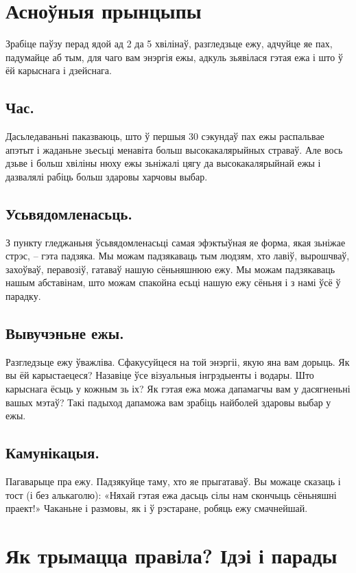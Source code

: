 \section{Асноўныя прынцыпы}

Зрабіце паўзу перад ядой ад 2 да 5 хвілінаў, разгледзьце ежу, адчуйце яе пах, падумайце аб тым, для чаго вам энэргія ежы, адкуль зьявілася гэтая ежа і што ў ёй карыснага і дзейснага.

\subsection{Час.}
Дасьледаваньні паказваюць, што ў першыя 30 сэкундаў пах ежы распальвае апэтыт і жаданьне зьесьці менавіта больш высокакалярыйных страваў. Але вось дзьве і больш хвіліны нюху ежы зьніжалі цягу да высокакалярыйнай ежы і дазвалялі рабіць больш здаровы харчовы выбар.

\subsection{Усьвядомленасьць.}
З пункту гледжаньня ўсьвядомленасьці самая эфэктыўная яе форма, якая зьніжае стрэс, – гэта падзяка. Мы можам падзякаваць тым людзям, хто лавіў, вырошчваў, захоўваў, перавозіў, гатаваў нашую сёньняшнюю ежу. Мы можам падзякаваць нашым абставінам, што можам спакойна есьці нашую ежу сёньня і з намі ўсё ў парадку.

\subsection{Вывучэньне ежы.}
Разгледзьце ежу ўважліва. Сфакусуйцеся на той энэргіі, якую яна вам дорыць. Як вы ёй карыстаецеся? Назавіце ўсе візуальныя інгрэдыенты і водары. Што карыснага ёсьць у кожным зь іх? Як гэтая ежа можа дапамагчы вам у дасягненьні вашых мэтаў? Такі падыход дапаможа вам зрабіць найболей здаровы выбар у ежы.

\subsection{Камунікацыя.}
Пагаварыце пра ежу. Падзякуйце таму, хто яе прыгатаваў. Вы можаце сказаць і тост (і без алькаголю): «Няхай гэтая ежа дасьць сілы нам скончыць сёньняшні праект!» Чаканьне і размовы, як і ў рэстаране, робяць ежу смачнейшай.

\section{Як трымацца правіла? Ідэі і парады}

